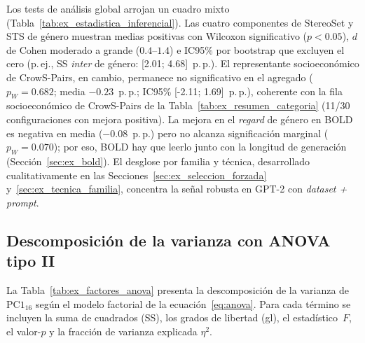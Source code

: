 \documentclass[12pt,a4paper]{report}
\newcommand{\PConeSixteen}{\ensuremath{\mathrm{PC1}_{16}}}
\begin{document}
Los tests de análisis global arrojan un cuadro mixto (Tabla~\ref{tab:ex_estadistica_inferencial}). Las cuatro componentes de StereoSet y STS de género muestran medias positivas con Wilcoxon significativo ($p<0.05$), $d$ de Cohen moderado a grande ($0.4$--$1.4$) e IC95\% por bootstrap que excluyen el cero (p.\,ej., SS \textit{inter} de género: [2.01; 4.68]~p.\,p.). El representante socioeconómico de CrowS-Pairs, en cambio, permanece no significativo en el agregado ($p_W=0.682$; media $-0.23$~p.\,p.; IC95\% [-2.11; 1.69]~p.\,p.), coherente con la fila socioeconómico de CrowS-Pairs de la Tabla~\ref{tab:ex_resumen_categoria} (11/30 configuraciones con mejora positiva). La mejora en el \textit{regard} de género en BOLD es negativa en media ($-0.08$~p.\,p.) pero no alcanza significación marginal ($p_W=0.070$); por eso, BOLD hay que leerlo junto con la longitud de generación (Sección~\ref{sec:ex_bold}). El desglose por familia y técnica, desarrollado cualitativamente en las Secciones~\ref{sec:ex_seleccion_forzada} y~\ref{sec:ex_tecnica_familia}, concentra la señal robusta en GPT-2 con \textit{dataset + prompt}.

\subsection{Descomposición de la varianza con ANOVA tipo II}
\label{subsec:ex_anova}

La Tabla~\ref{tab:ex_factores_anova} presenta la descomposición de la varianza de \PConeSixteen{} según el modelo factorial de la ecuación~\eqref{eq:anova}. Para cada término se incluyen la suma de cuadrados (SS), los grados de libertad (gl), el estadístico~$F$, el valor-$p$ y la fracción de varianza explicada $\eta^2$.
\end{document}
